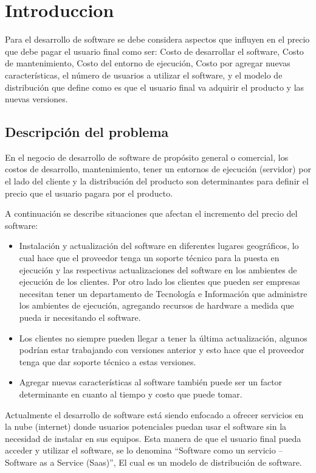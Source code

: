 \chapter{Introduccion}
\noindent Para el desarrollo de software se debe considera aspectos que influyen en el precio que debe pagar el usuario final como ser: Costo de desarrollar el software, Costo de mantenimiento, Costo del entorno de ejecución,  Costo por agregar nuevas características, el número de usuarios a utilizar el software, y el modelo de distribución que define como es que el usuario final va adquirir el producto y las nuevas versiones. 

\section{Descripción del problema}
\noindent En el negocio de desarrollo de software de propósito general o comercial, los costos de desarrollo, mantenimiento, tener un entornos de ejecución (servidor) por el lado del cliente y la distribución del producto son determinantes para definir el precio que el usuario pagara por el producto.

\noindent A continuación se describe situaciones que afectan el incremento del precio del software:

\begin{itemize}
   	\item Instalación y actualización del software en diferentes lugares geográficos, lo cual hace que el proveedor tenga un soporte técnico para la puesta en ejecución y 	 las respectivas actualizaciones del software en los ambientes de ejecución de los clientes. Por otro lado los clientes que pueden ser empresas necesitan tener un departamento de Tecnología e Información que administre los ambientes de ejecución, agregando recursos de hardware a medida que pueda ir necesitando el software.
    \item Los clientes no siempre pueden llegar a tener la última actualización, algunos podrían estar trabajando con versiones anterior y esto hace que el proveedor tenga que dar soporte técnico a estas versiones.
    \item Agregar nuevas características al software también puede ser un factor determinante en cuanto al tiempo y costo que puede tomar.

\end{itemize}

\noindent Actualmente el desarrollo de software está siendo enfocado a ofrecer servicios en la nube (internet) donde usuarios potenciales puedan usar el software sin la necesidad de instalar en sus equipos. Esta manera de que el usuario final pueda acceder y utilizar el software, se lo denomina “Software como un servicio – Software as a Service (Saas)”, El cual es un modelo de distribución de software.

